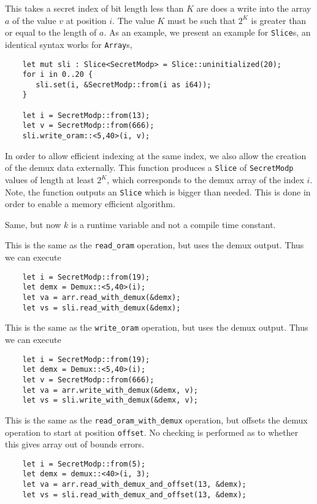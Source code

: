 This takes a secret index of bit length less than $K$ are does a
write into the array $a$ of the value $v$ at position $i$.
The value $K$ must be such that $2^K$ is greater than or equal
to the length of $a$.
As an example, we present an example for \verb|Slice|s,
an identical syntax works for \verb|Array|s,
\begin{lstlisting}
    let mut sli : Slice<SecretModp> = Slice::uninitialized(20);
    for i in 0..20 {
       sli.set(i, &SecretModp::from(i as i64));
    }

    let i = SecretModp::from(13);
    let v = SecretModp::from(666);
    sli.write_oram::<5,40>(i, v);
\end{lstlisting}

In order to allow efficient indexing at the same index, we also
allow the creation of the demux data externally.
This function produces a \verb|Slice| of \verb|SecretModp| values
of length at least $2^K$, which corresponds to the demux array of
the index $i$.
Note, the function outputs an \verb|Slice| which is bigger than 
needed. This is done in order to enable a memory efficient algorithm.

Same, but now $k$ is a runtime variable and not a compile time constant.

This is the same as the \verb|read_oram| operation, but uses
the demux output.
Thus we can execute
\begin{lstlisting}
    let i = SecretModp::from(19);
    let demx = Demux::<5,40>(i);
    let va = arr.read_with_demux(&demx);
    let vs = sli.read_with_demux(&demx);
\end{lstlisting}


This is the same as the \verb|write_oram| operation, but uses
the demux output.
Thus we can execute
\begin{lstlisting}
    let i = SecretModp::from(19);
    let demx = Demux::<5,40>(i);
    let v = SecretModp::from(666);
    let va = arr.write_with_demux(&demx, v);
    let vs = sli.write_with_demux(&demx, v);
\end{lstlisting}

This is the same as the \verb|read_oram_with_demux| operation, but 
offsets the demux operation to start at position \verb|offset|.
No checking is performed as to whether this gives array out
of bounds errors.
\begin{lstlisting}
    let i = SecretModp::from(5);
    let demx = demux::<40>(i, 3);
    let va = arr.read_with_demux_and_offset(13, &demx);
    let vs = sli.read_with_demux_and_offset(13, &demx);
\end{lstlisting}


